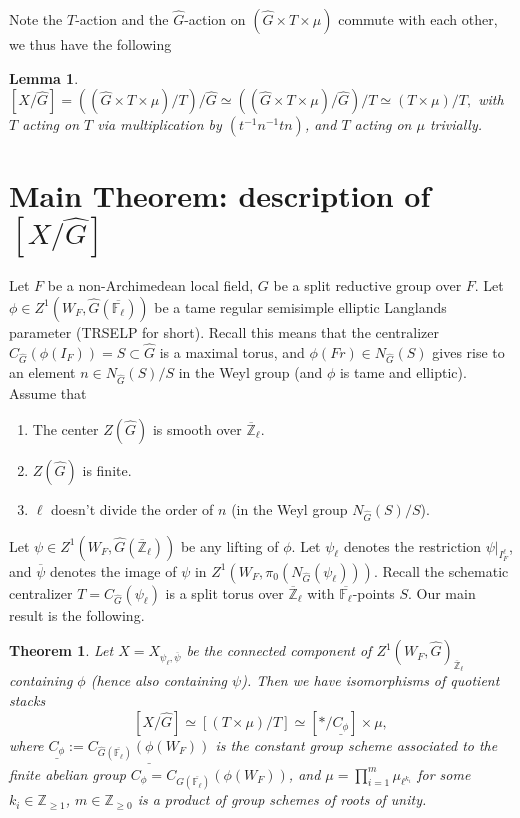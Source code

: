 \documentclass{article}
\newtheorem{theorem}{Theorem}
\newtheorem{lemma}{Lemma}
\begin{document}
	Note the $T$-action and the $\hat{G}$-action on $(\hat{G} \times T \times \mu)$ commute with each other, we thus have the following
	
	\begin{lemma}
		$[X/\hat{G}] = ((\hat{G} \times T \times \mu)/T)/\hat{G} \simeq ((\hat{G} \times T \times \mu)/\hat{G})/T \simeq (T \times \mu)/T, $ with $T$ acting on $T$ via multiplication by $(t^{-1}n^{-1}tn)$, and $T$ acting on $\mu$ trivially.
	\end{lemma}
	
	
	
	\section{Main Theorem: description of $[X/\hat{G}]$}
	Let $F$ be a non-Archimedean local field, $G$ be a split reductive group over $F$. Let $\phi \in Z^1(W_F, \hat{G}(\overline{\mathbb{F}_{\ell}}))$ be a tame regular semisimple elliptic Langlands parameter (TRSELP for short). Recall this means that the centralizer $C_{\hat{G}}(\phi(I_F))=S \subset \hat{G}$ is a maximal torus, and $\phi(Fr) \in N_{\hat{G}}(S)$ gives rise to an element $n \in N_{\hat{G}}(S)/S$ in the Weyl group (and $\phi$ is tame and elliptic). Assume that
	\begin{enumerate}
		\item The center $Z(\hat{G})$ is smooth over $\overline{\mathbb{Z}}_{\ell}.$
		\item $Z(\hat{G})$ is finite.
		\item $\ell$ doesn't divide the order of $n$ (in the Weyl group $N_{\hat{G}}(S)/S$). 
	\end{enumerate}
	Let $\psi \in Z^1(W_F, \hat{G}(\overline{\mathbb{Z}}_{\ell}))$ be any lifting of $\phi$. Let $\psi_{\ell}$ denotes the restriction $\psi|_{I_F^{\ell}}$, and $\overline{\psi}$ denotes the image of $\psi$ in $Z^1(W_F, \pi_0(N_{\hat{G}}(\psi_{\ell})))$. Recall the schematic centralizer $T=C_{\hat{G}}(\psi_{\ell})$ is a split torus over $\overline{\mathbb{Z}}_{\ell}$ with $\overline{\mathbb{F}_{\ell}}$-points $S$. Our main result is the following.
	
	\begin{theorem}
		Let $X=X_{\psi_{\ell}, \overline{\psi}}$ be the connected component of $Z^1(W_F, \hat{G})_{\overline{\mathbb{Z}}_{\ell}}$ containing $\phi$ (hence also containing $\psi$). Then we have isomorphisms of quotient stacks
		$$[X/\hat{G}] \simeq [(T \times \mu)/T] \simeq [*/\underline{C_{\phi}}] \times \mu,$$
		where $\underline{C_{\phi}}:=\underline{C_{\hat{G}(\overline{\mathbb{F}_{\ell}})}(\phi(W_F))}$ is the constant group scheme associated to the finite abelian group $C_{\phi}=C_{\hat{G}(\overline{\mathbb{F}_{\ell}})}(\phi(W_F))$, and $\mu=\prod_{i=1}^m\mu_{\ell^{k_i}}$ for some $k_i \in \mathbb{Z}_{\geq 1}$, $m \in \mathbb{Z}_{\geq 0}$ is a product of group schemes of roots of unity.
		
	\end{theorem}
	
\end{document}
